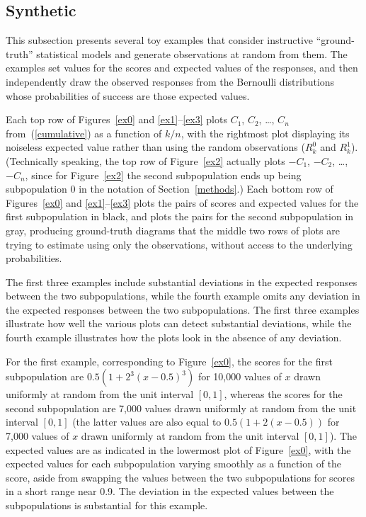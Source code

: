 \documentclass{article}
\begin{document}
\subsection{Synthetic}
\label{synthetic}

This subsection presents several toy examples
that consider instructive ``ground-truth'' statistical models
and generate observations at random from them.
The examples set values for the scores and expected values of the responses,
and then independently draw the observed responses
from the Bernoulli distributions whose probabilities of success
are those expected values.

Each top row of Figures~\ref{ex0} and \ref{ex1}--\ref{ex3}
plots $C_1$, $C_2$, \dots, $C_n$
from~(\ref{cumulative}) as a function of $k/n$,
with the rightmost plot displaying its noiseless expected value
rather than using the random observations ($R^0_k$ and $R^1_k$).
(Technically speaking, the top row of Figure~\ref{ex2} actually plots
$-C_1$, $-C_2$, \dots, $-C_n$, since for Figure~\ref{ex2}
the second subpopulation ends up being subpopulation 0
in the notation of Section~\ref{methods}.)
Each bottom row of Figures~\ref{ex0} and \ref{ex1}--\ref{ex3} plots the pairs
of scores and expected values for the first subpopulation in black,
and plots the pairs for the second subpopulation in gray,
producing ground-truth diagrams that the middle two rows of plots
are trying to estimate using only the observations,
without access to the underlying probabilities.

The first three examples include substantial deviations
in the expected responses between the two subpopulations,
while the fourth example omits any deviation
in the expected responses between the two subpopulations.
The first three examples illustrate how well the various plots can detect
substantial deviations, while the fourth example illustrates how the plots look
in the absence of any deviation.

For the first example, corresponding to Figure~\ref{ex0},
the scores for the first subpopulation
are $0.5 (1 + 2^3 (x - 0.5)^3)$ for 10,000 values of $x$
drawn uniformly at random from the unit interval $[0, 1]$,
whereas the scores for the second subpopulation are 7,000 values
drawn uniformly at random from the unit interval $[0, 1]$
(the latter values are also equal to $0.5 (1 + 2 (x - 0.5))$
for 7,000 values of $x$ drawn uniformly at random from the unit interval
$[0, 1]$).
The expected values are as indicated in the lowermost plot of Figure~\ref{ex0},
with the expected values for each subpopulation varying smoothly
as a function of the score, aside from swapping the values between
the two subpopulations for scores in a short range near 0.9.
The deviation in the expected values between the subpopulations
is substantial for this example.
\end{document}
